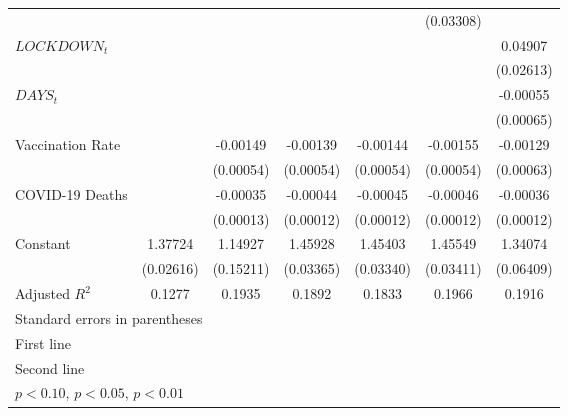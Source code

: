 \begin{table}[htbp]
\begin{tabular}{l*{6}{c}}
                    &                     &                     &                     &                     &   (0.03308)         &                     \\
\addlinespace
$LOCKDOWN_t$&                     &                     &                     &                     &                     &     0.04907\sym{*}  \\
                    &                     &                     &                     &                     &                     &   (0.02613)         \\
\addlinespace
$DAYS_t$                &                     &                     &                     &                     &                     &    -0.00055         \\
                    &                     &                     &                     &                     &                     &   (0.00065)         \\
\addlinespace
Vaccination Rate    &                     &    -0.00149\sym{***}&    -0.00139\sym{***}&    -0.00144\sym{***}&    -0.00155\sym{***}&    -0.00129\sym{**} \\
                    &                     &   (0.00054)         &   (0.00054)         &   (0.00054)         &   (0.00054)         &   (0.00063)         \\
\addlinespace
COVID-19 Deaths&                     &    -0.00035\sym{***}&    -0.00044\sym{***}&    -0.00045\sym{***}&    -0.00046\sym{***}&    -0.00036\sym{***}\\
                    &                     &   (0.00013)         &   (0.00012)         &   (0.00012)         &   (0.00012)         &   (0.00012)         \\
\addlinespace
Constant            &     1.37724\sym{***}&     1.14927\sym{***}&     1.45928\sym{***}&     1.45403\sym{***}&     1.45549\sym{***}&     1.34074\sym{***}\\
                    &   (0.02616)         &   (0.15211)         &   (0.03365)         &   (0.03340)         &   (0.03411)         &   (0.06409)         \\
\midrule
Adjusted $R^2$        &         0.1277         &         0.1935         &         0.1892         &         0.1833         &         0.1966         &         0.1916         \\
\bottomrule
\multicolumn{7}{l}{\footnotesize Standard errors in parentheses}\\
\multicolumn{7}{l}{\footnotesize First line}\\
\multicolumn{7}{l}{\footnotesize Second line}\\
\multicolumn{7}{l}{\footnotesize \sym{*} \(p<0.10\), \sym{**} \(p<0.05\), \sym{***} \(p<0.01\)}\\
\end{tabular}
\end{table}
